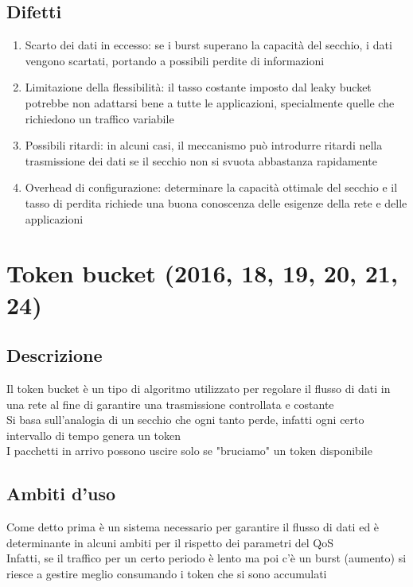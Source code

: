\documentclass[10pt,oneside,a4paper]{article}
\begin{document}
\subsection{Difetti}
\begin{enumerate}
    \item Scarto dei dati in eccesso: se i burst superano la capacità del secchio, i dati vengono scartati, portando a possibili perdite di informazioni
    \item Limitazione della flessibilità: il tasso costante imposto dal leaky bucket potrebbe non adattarsi bene a tutte le applicazioni, specialmente quelle che richiedono un traffico variabile
    \item Possibili ritardi: in alcuni casi, il meccanismo può introdurre ritardi nella trasmissione dei dati se il secchio non si svuota abbastanza rapidamente
    \item Overhead di configurazione: determinare la capacità ottimale del secchio e il tasso di perdita richiede una buona conoscenza delle esigenze della rete e delle applicazioni
\end{enumerate}
\section{Token bucket (2016, 18, 19, 20, 21, 24)}
\subsection{Descrizione}
Il token bucket è un tipo di algoritmo utilizzato per regolare il flusso di dati in una rete al fine di garantire una trasmissione controllata e costante\\
Si basa sull'analogia di un secchio che ogni tanto perde, infatti ogni certo intervallo di tempo genera un token\\
I pacchetti in arrivo possono uscire solo se "bruciamo" un token disponibile
\subsection{Ambiti d'uso}
Come detto prima è un sistema necessario per garantire il flusso di dati ed è determinante in alcuni ambiti per il rispetto dei parametri del QoS\\
Infatti, se il traffico per un certo periodo è lento ma poi c'è un burst (aumento) si riesce a gestire meglio consumando i token che si sono accumulati
\end{document}
